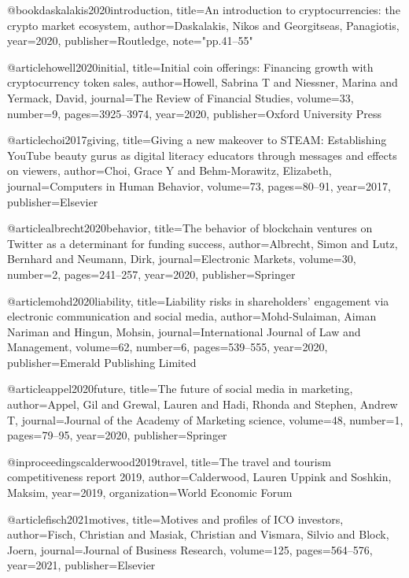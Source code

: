 @book{daskalakis2020introduction,
  title={An introduction to cryptocurrencies: the crypto market ecosystem},
  author={Daskalakis, Nikos and Georgitseas, Panagiotis},
  year={2020},
  publisher={Routledge},
  note="pp.41--55"
}

@article{howell2020initial,
  title={Initial coin offerings: Financing growth with cryptocurrency token sales},
  author={Howell, Sabrina T and Niessner, Marina and Yermack, David},
  journal={The Review of Financial Studies},
  volume={33},
  number={9},
  pages={3925--3974},
  year={2020},
  publisher={Oxford University Press}
}

@article{choi2017giving,
  title={Giving a new makeover to STEAM: Establishing YouTube beauty gurus as digital literacy educators through messages and effects on viewers},
  author={Choi, Grace Y and Behm-Morawitz, Elizabeth},
  journal={Computers in Human Behavior},
  volume={73},
  pages={80--91},
  year={2017},
  publisher={Elsevier}
}

@article{albrecht2020behavior,
  title={The behavior of blockchain ventures on Twitter as a determinant for funding success},
  author={Albrecht, Simon and Lutz, Bernhard and Neumann, Dirk},
  journal={Electronic Markets},
  volume={30},
  number={2},
  pages={241--257},
  year={2020},
  publisher={Springer}
}

@article{mohd2020liability,
  title={Liability risks in shareholders’ engagement via electronic communication and social media},
  author={Mohd-Sulaiman, Aiman Nariman and Hingun, Mohsin},
  journal={International Journal of Law and Management},
  volume={62},
  number={6},
  pages={539--555},
  year={2020},
  publisher={Emerald Publishing Limited}
}

@article{appel2020future,
  title={The future of social media in marketing},
  author={Appel, Gil and Grewal, Lauren and Hadi, Rhonda and Stephen, Andrew T},
  journal={Journal of the Academy of Marketing science},
  volume={48},
  number={1},
  pages={79--95},
  year={2020},
  publisher={Springer}
}

@inproceedings{calderwood2019travel,
  title={The travel and tourism competitiveness report 2019},
  author={Calderwood, Lauren Uppink and Soshkin, Maksim},
  year={2019},
  organization={World Economic Forum}
}

@article{fisch2021motives,
  title={Motives and profiles of ICO investors},
  author={Fisch, Christian and Masiak, Christian and Vismara, Silvio and Block, Joern},
  journal={Journal of Business Research},
  volume={125},
  pages={564--576},
  year={2021},
  publisher={Elsevier}
}

